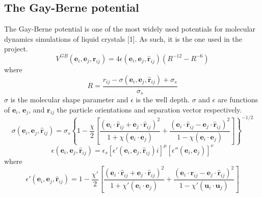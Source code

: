 \documentclass[preprint, aps]{revtex4-1}
\begin{document}
\subsection*{The Gay-Berne potential}
The Gay-Berne potential is one of the most widely used potentials for molecular 
dynamics simulations of liquid crystals [1]. As such, it is the one used in the 
project.
	\begin{equation} \label{gay-berne}
		V^{GB}(\mathbf{e}_i,\mathbf{e}_j,\mathbf{r}_{ij})
			= 4\epsilon (\mathbf{e}_i,\mathbf{e}_j,\mathbf{\hat{r}}_{ij}) 
			(R^{-12}-R^{-6})
	\end{equation}
where
	\begin{equation} \label{distance-term}
		R = \frac{
			r_{ij} - \sigma(\mathbf{e}_i,\mathbf{e}_j,\mathbf{\hat{r}}_{ij})
			+ \sigma_s
		}
		{
			\sigma_s
		}
	\end{equation}
$\sigma$ is the molecular shape parameter and $\epsilon$ is the well depth. 
$\sigma$ and $\epsilon$ are functions of $\mathbf{e}_i$,  $\mathbf{e}_j$, and 
$\mathbf{r}_{ij}$ the particle orientations and separation vector respectively.
	\begin{equation} \label{distance-function}
		\sigma(\mathbf{e}_i,\mathbf{e}_j,\mathbf{\hat{r}}_{ij})
		= \sigma_s \left\{
			1 
			- \frac{\chi}{2} \left[
				\frac{
					(\mathbf{e}_i \cdot \mathbf{\hat{r}}_{ij} 
					+ \mathbf{e}_j \cdot \mathbf{\hat{r}}_{ij})^2
				}
				{
					1 + \chi(\mathbf{e}_i\cdot\mathbf{e}_j)
				}
				+\frac{
					(\mathbf{e}_i \cdot \mathbf{\hat{r}}_{ij} 
					- \mathbf{e}_j \cdot \mathbf{\hat{r}}_{ij})^2
				}
				{
					1 - \chi(\mathbf{e}_i \cdot \mathbf{e}_j)
				}
		\right]\right\}^{-1/2}
	\end{equation}
	\begin{equation} \label{orientation-function}
		\epsilon(\mathbf{e}_i,\mathbf{e}_j,\mathbf{\hat{r}}_{ij}) 
		= \epsilon_s
			\left[	
				\epsilon'(\mathbf{e}_i,\mathbf{e}_j,\mathbf{\hat{r}}_{ij})i
			\right]^\mu
			\left[
				\epsilon''(\mathbf{e}_i,\mathbf{e}_j)
			\right]^\nu
	\end{equation}
where
	\begin{equation} \label{o-func1}
		\epsilon'(\mathbf{e}_i,\mathbf{e}_j,\mathbf{\hat{r}}_{ij}) 
		= 1 - \frac{\chi'}{2}
		\left[
			\frac{
				(\mathbf{e}_i \cdot \mathbf{\hat{r}}_{ij} 
				+ \mathbf{e}_j \cdot \mathbf{\hat{r}}_{ij})^2
			}
			{
				1+\chi'(\mathbf{e}_i \cdot \mathbf{e}_j)
			}
			+ \frac{
				(\mathbf{e}_i \cdot \mathbf{\hat{r}}_{ij} 
				- \mathbf{e}_j \cdot \mathbf{\hat{r}}_{ij})^2
				}
				{
					1-\chi'(\mathbf{u}_i \cdot \mathbf{u}_j)
				}
		\right]
	\end{equation}
\end{document}
